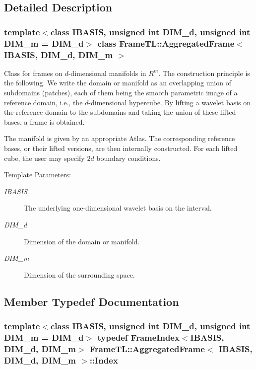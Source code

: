 \subsection{Detailed Description}
\subsubsection*{template$<$class IBASIS, unsigned int DIM\_\-d, unsigned int DIM\_\-m = DIM\_\-d$>$ class FrameTL::AggregatedFrame$<$ IBASIS, DIM\_\-d, DIM\_\-m $>$}

Class for frames on $d$-dimensional manifolds in $R^m$. The construction principle is the following. We write the domain or manifold as an overlapping union of subdomains (patches), each of them being the smooth parametric image of a reference domain, i.e., the $d$-dimensional hypercube. By lifting a wavelet basis on the reference domain to the subdomains and taking the union of these lifted bases, a frame is obtained.

The manifold is given by an appropriate Atlas. The corresponding reference bases, or their lifted versions, are then internally constructed. For each lifted cube, the user may specify $2d$ boundary conditions.

\begin{Desc}
\item[Template Parameters:]
\begin{description}
\item[{\em IBASIS}]The underlying one-dimensional wavelet basis on the interval. \item[{\em DIM\_\-d}]Dimension of the domain or manifold. \item[{\em DIM\_\-m}]Dimension of the surrounding space. \end{description}
\end{Desc}


\subsection{Member Typedef Documentation}
\hypertarget{classFrameTL_1_1AggregatedFrame_62f05cb9f21d52568f720cde28eb124b}{
\subsubsection[{Index}]{\setlength{\rightskip}{0pt plus 5cm}template$<$class IBASIS, unsigned int DIM\_\-d, unsigned int DIM\_\-m = DIM\_\-d$>$ {\bf typedef} {\bf FrameIndex}$<$IBASIS, DIM\_\-d, DIM\_\-m$>$ {\bf FrameTL::AggregatedFrame}$<$ IBASIS, DIM\_\-d, DIM\_\-m $>$::{\bf Index}}}
\label{classFrameTL_1_1AggregatedFrame_62f05cb9f21d52568f720cde28eb124b}


